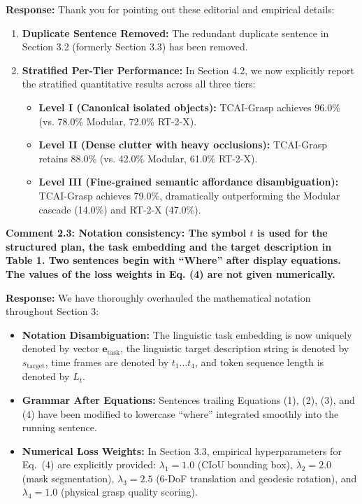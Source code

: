 \documentclass[11pt]{article}
\newcommand{\reviewercomment}[1]{\vspace{1.8ex}\noindent\textbf{\textcolor{revcolor}{#1}}}
\newcommand{\response}{\vspace{1ex}\noindent\textbf{Response: }}
\begin{document}
\response
Thank you for pointing out these editorial and empirical details:
\begin{enumerate}[leftmargin=*]
    \item \textbf{Duplicate Sentence Removed:} The redundant duplicate sentence in Section 3.2 (formerly Section 3.3) has been removed.
    \item \textbf{Stratified Per-Tier Performance:} In Section 4.2, we now explicitly report the stratified quantitative results across all three tiers:
    \begin{itemize}
        \item \textbf{Level I (Canonical isolated objects):} TCAI-Grasp achieves 96.0\% (vs. 78.0\% Modular, 72.0\% RT-2-X).
        \item \textbf{Level II (Dense clutter with heavy occlusions):} TCAI-Grasp retains 88.0\% (vs. 42.0\% Modular, 61.0\% RT-2-X).
        \item \textbf{Level III (Fine-grained semantic affordance disambiguation):} TCAI-Grasp achieves 79.0\%, dramatically outperforming the Modular cascade (14.0\%) and RT-2-X (47.0\%).
    \end{itemize}
\end{enumerate}

\reviewercomment{Comment 2.3: Notation consistency: The symbol $t$ is used for the structured plan, the task embedding and the target description in Table 1. Two sentences begin with ``Where'' after display equations. The values of the loss weights in Eq. (4) are not given numerically.}

\response
We have thoroughly overhauled the mathematical notation throughout Section 3:
\begin{itemize}[leftmargin=*]
    \item \textbf{Notation Disambiguation:} The linguistic task embedding is now uniquely denoted by vector $\mathbf{e}_{\text{task}}$, the linguistic target description string is denoted by $s_{\text{target}}$, time frames are denoted by $t_1 \dots t_4$, and token sequence length is denoted by $L_t$.
    \item \textbf{Grammar After Equations:} Sentences trailing Equations (1), (2), (3), and (4) have been modified to lowercase ``where'' integrated smoothly into the running sentence.
    \item \textbf{Numerical Loss Weights:} In Section 3.3, empirical hyperparameters for Eq.~(4) are explicitly provided: $\lambda_1 = 1.0$ (CIoU bounding box), $\lambda_2 = 2.0$ (mask segmentation), $\lambda_3 = 2.5$ (6-DoF translation and geodesic rotation), and $\lambda_4 = 1.0$ (physical grasp quality scoring).
\end{itemize}
\end{document}

